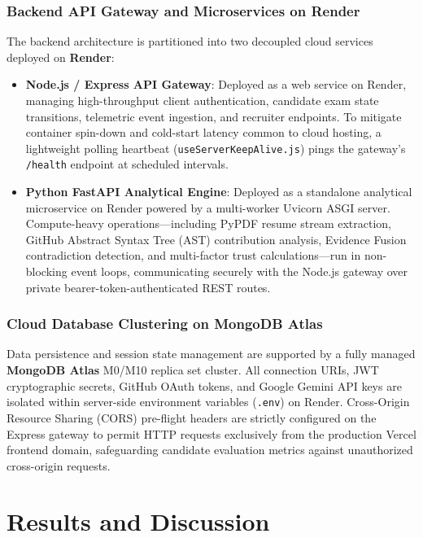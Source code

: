 \subsection{Backend API Gateway and Microservices on Render}
The backend architecture is partitioned into two decoupled cloud services deployed on \textbf{Render}:
\begin{itemize}
    \item \textbf{Node.js / Express API Gateway}: Deployed as a web service on Render, managing high-throughput client authentication, candidate exam state transitions, telemetric event ingestion, and recruiter endpoints. To mitigate container spin-down and cold-start latency common to cloud hosting, a lightweight polling heartbeat (\texttt{useServerKeepAlive.js}) pings the gateway's \texttt{/health} endpoint at scheduled intervals.
    \item \textbf{Python FastAPI Analytical Engine}: Deployed as a standalone analytical microservice on Render powered by a multi-worker Uvicorn ASGI server. Compute-heavy operations—including PyPDF resume stream extraction, GitHub Abstract Syntax Tree (AST) contribution analysis, Evidence Fusion contradiction detection, and multi-factor trust calculations—run in non-blocking event loops, communicating securely with the Node.js gateway over private bearer-token-authenticated REST routes.
\end{itemize}

\subsection{Cloud Database Clustering on MongoDB Atlas}
Data persistence and session state management are supported by a fully managed \textbf{MongoDB Atlas} M0/M10 replica set cluster. All connection URIs, JWT cryptographic secrets, GitHub OAuth tokens, and Google Gemini API keys are isolated within server-side environment variables (\texttt{.env}) on Render. Cross-Origin Resource Sharing (CORS) pre-flight headers are strictly configured on the Express gateway to permit HTTP requests exclusively from the production Vercel frontend domain, safeguarding candidate evaluation metrics against unauthorized cross-origin requests.

\clearpage

\chapter{Results and Discussion}
